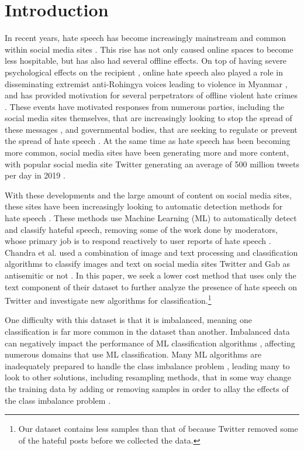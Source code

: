 \documentclass[runningheads]{llncs}
\begin{document}
\section{Introduction}
In recent years, hate speech has become increasingly mainstream and common within social media sites \cite{siegel}. This rise has not only caused online spaces to become less hospitable, but has also had several offline effects. On top of having severe psychological effects on the recipient \cite{siegel}, online hate speech also played a role in disseminating extremist anti-Rohingya voices leading to violence in Myanmar \cite{green}, and has provided motivation for several perpetrators of offline violent hate crimes \cite{siegel}. These events have motivated responses from numerous parties, including the social media sites themselves, that are increasingly looking to stop the spread of these messages \cite{ullmann}, and governmental bodies, that are seeking to regulate or prevent the spread of hate speech \cite{banks}. At the same time as hate speech has been becoming more common, social media sites have been generating more and more content, with popular social media site Twitter generating an average of 500 million tweets per day in 2019 \cite{pereira}.

With these developments and the large amount of content on social media sites, these sites have been increasingly looking to automatic detection methods for hate speech \cite{ullmann}. These methods use Machine Learning (ML) to automatically detect and classify hateful speech, removing some of the work done by moderators, whose primary job is to respond reactively to user reports of hate speech \cite{ullmann}. Chandra et al. \cite{chandra} used a combination of image and text processing and classification algorithms to classify images and text on social media sites Twitter and Gab as antisemitic or not \cite{chandra}. In this paper, we seek a lower cost method that uses only the text component of their dataset to further analyze the presence of hate speech on Twitter and investigate new algorithms for classification.\footnote{Our dataset contains less samples than that of \cite{chandra} because Twitter removed some of the hateful posts before we collected the data.}

One difficulty with this dataset is that it is imbalanced, meaning one classification is far more common in the dataset than another. Imbalanced data can negatively impact the performance of ML classification algorithms \cite{sun}, affecting numerous domains that use ML classification. Many ML algorithms are inadequately prepared to handle the class imbalance problem \cite{sun}, leading many to look to other solutions, including resampling methods, that in some way change the training data by adding or removing samples in order to allay the effects of the class imbalance problem \cite{japkowicz}.
\end{document}
